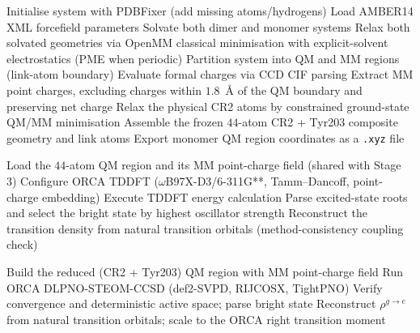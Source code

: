 \documentclass[journal=jpcbfk, manuscript=article, layout=twocolumn, doi=true]{achemso}
\begin{document}
\begin{algorithm*}[t]
\caption{Quantum-Classical Hybrid Excitonic Coupling Pipeline \\(\texttt{reproduce\_paper.py})}
\label{alg:pipeline}
\footnotesize
\begin{algorithmic}[1]
    \State {}
    \State {}      
    \State {}      
              
        \State {} 
    \EndIf
    \State {}         
\EndProcedure

\vspace{0.05cm}
    \State Initialise system with PDBFixer (add missing atoms/hydrogens)
    \State Load AMBER14 XML forcefield parameters
    \State Solvate both dimer and monomer systems
    \State Relax both solvated geometries via OpenMM classical minimisation with explicit-solvent electrostatics (PME when periodic)
    \State Partition system into QM and MM regions (link-atom boundary)
    \State Evaluate formal charges via CCD CIF parsing
    \State Extract MM point charges, excluding charges within $1.8$~\AA{} of the QM boundary and preserving net charge
    \State Relax the physical CR2 atoms by constrained ground-state QM/MM minimisation
    \State Assemble the frozen $44$-atom CR2 + Tyr203 composite geometry and link atoms
    \State Export monomer QM region coordinates as a \texttt{.xyz} file
\EndProcedure

\vspace{0.05cm}
    \State Load the $44$-atom QM region and its MM point-charge field (shared with Stage 3)
    \State Configure ORCA TDDFT ($\omega$B97X-D3/6-311G**, Tamm--Dancoff, point-charge embedding)
    \State Execute TDDFT energy calculation
    \State Parse excited-state roots and select the bright state by highest oscillator strength
    \State Reconstruct the transition density from natural transition orbitals (method-consistency coupling check)
\EndProcedure

\vspace{0.05cm}
    \State Build the reduced (CR2 + Tyr203) QM region with MM point-charge field
    \State Run ORCA DLPNO-STEOM-CCSD (def2-SVPD, RIJCOSX, TightPNO)
    \State Verify convergence and deterministic active space; parse bright state
    \State Reconstruct $\rho^{g\to e}$ from natural transition orbitals; scale to the ORCA right transition moment
\EndProcedure


\end{algorithmic}
\end{algorithm*}
\end{document}
